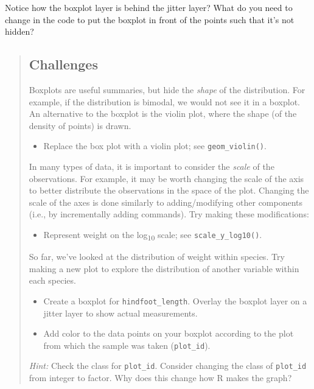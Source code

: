 \documentclass[]{book}
\providecommand{\tightlist}{%
  \setlength{\itemsep}{0pt}\setlength{\parskip}{0pt}}
\begin{document}
Notice how the boxplot layer is behind the jitter layer? What do you
need to change in the code to put the boxplot in front of the points
such that it's not hidden?

\begin{quote}
\subsection{Challenges}\label{challenges}

Boxplots are useful summaries, but hide the \emph{shape} of the
distribution. For example, if the distribution is bimodal, we would not
see it in a boxplot. An alternative to the boxplot is the violin plot,
where the shape (of the density of points) is drawn.

\begin{itemize}
\tightlist
\item
  Replace the box plot with a violin plot; see \texttt{geom\_violin()}.
\end{itemize}

In many types of data, it is important to consider the \emph{scale} of
the observations. For example, it may be worth changing the scale of the
axis to better distribute the observations in the space of the plot.
Changing the scale of the axes is done similarly to adding/modifying
other components (i.e., by incrementally adding commands). Try making
these modifications:

\begin{itemize}
\tightlist
\item
  Represent weight on the log\textsubscript{10} scale; see
  \texttt{scale\_y\_log10()}.
\end{itemize}

So far, we've looked at the distribution of weight within species. Try
making a new plot to explore the distribution of another variable within
each species.

\begin{itemize}
\item
  Create a boxplot for \texttt{hindfoot\_length}. Overlay the boxplot
  layer on a jitter layer to show actual measurements.
\item
  Add color to the data points on your boxplot according to the plot
  from which the sample was taken (\texttt{plot\_id}).
\end{itemize}

\emph{Hint:} Check the class for \texttt{plot\_id}. Consider changing
the class of \texttt{plot\_id} from integer to factor. Why does this
change how R makes the graph?
\end{quote}
\end{document}
